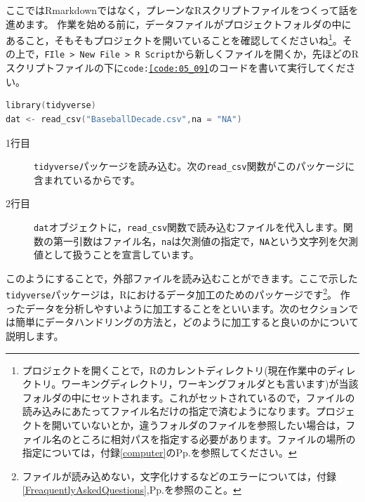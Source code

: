 \documentclass{ltjsbook}
\begin{document}
ここではRmarkdownではなく，プレーンなRスクリプトファイルをつくって話を進めます。
作業を始める前に，データファイルがプロジェクトフォルダの中にあること，そもそもプロジェクトを開いていることを確認してくださいね\footnote{プロジェクトを開くことで，Rのカレントディレクトリ(現在作業中のディレクトリ。ワーキングディレクトリ，ワーキングフォルダとも言います)が当該フォルダの中にセットされます。これがセットされているので，ファイルの読み込みにあたってファイル名だけの指定で済むようになります。プロジェクトを開いていないとか，違うフォルダのファイルを参照したい場合は，ファイル名のところに相対パスを指定する必要があります。ファイルの場所の指定については，付録\ref{computer}のPp.\pageref{setLocation}を参照してください。}。その上で，\verb|FIle > New File > R Script|から新しくファイルを開くか，先ほどのRスクリプトファイルの下に\texttt{code:\ref{code:05_09}}のコードを書いて実行してください。

\begin{lstlisting}[language=c++,label={code:05_09},caption={CSVファイルを読み込む}]
library(tidyverse)
dat <- read_csv("BaseballDecade.csv",na = "NA")
\end{lstlisting}

\begin{description}
	\item[1行目] \texttt{tidyverse}パッケージを読み込む。次の\verb|read_csv|関数がこのパッケージに含まれているからです。
	\item[2行目] \texttt{dat}オブジェクトに，\verb|read_csv|関数で読み込むファイルを代入します。関数の第一引数はファイル名，\verb|na|は欠測値の指定で，\texttt{NA}という文字列を欠測値として扱うことを宣言しています。
\end{description}

このようにすることで，外部ファイルを読み込むことができます。ここで示した\verb|tidyverse|パッケージは，Rにおけるデータ加工のためのパッケージです\footnote{ファイルが読み込めない，文字化けするなどのエラーについては，付録\ref{FreaquentlyAskedQuestions},Pp.\pageref{FreaquentlyAskedQuestions}を参照のこと。}。
作ったデータを分析しやすいように加工することをといいます。次のセクションでは簡単にデータハンドリングの方法と，どのように加工すると良いのかについて説明します。
\end{document}
